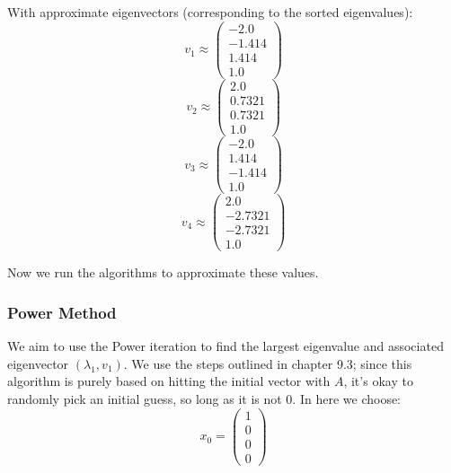 \documentclass[12pt]{article} %
\newcommand{\1}[1]{\mathds{1}\left[#1\right]}
\begin{document}
With approximate eigenvectors (corresponding to the sorted eigenvalues):
$$
	v_1 \approx 
	\begin{pmatrix}
		-2.0 \\
		-1.414 \\
		1.414\\
		1.0
	\end{pmatrix}
$$
$$
	v_2 \approx 
	\begin{pmatrix}
		2.0 \\
		0.7321 \\
		0.7321\\
		1.0
	\end{pmatrix}
$$
$$
	v_3 \approx 
	\begin{pmatrix}
		-2.0 \\
		1.414 \\
		-1.414\\
		1.0
	\end{pmatrix}
$$
$$
	v_4 \approx 
	\begin{pmatrix}
		2.0 \\
		-2.7321 \\
		-2.7321\\
		1.0
	\end{pmatrix}
$$

Now we run the algorithms to approximate these values.
\subsubsection{Power Method}
We aim to use the Power iteration to find the largest eigenvalue and associated eigenvector $(\lambda_1, v_1)$. We use the steps outlined in chapter 9.3; since this algorithm is purely based on hitting the initial vector with $A$, it's okay to randomly pick an initial guess, so long as it is not 0. In here we choose:
$$
	x_0 = 
	\begin{pmatrix}
	1\\
	0\\
	0\\
	0
	\end{pmatrix}
$$
\end{document}
